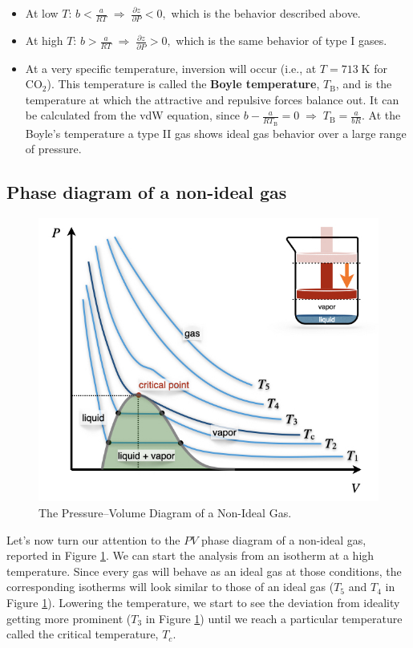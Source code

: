 \documentclass[
  9pt,
]{extbook}
\providecommand{\tightlist}{%
  \setlength{\itemsep}{0pt}\setlength{\parskip}{0pt}}
\theoremstyle{definition}
\theoremstyle{definition}
\theoremstyle{definition}
\theoremstyle{remark}
\begin{document}
\begin{itemize}
\tightlist
\item
  At low \(T\): \(b<\frac{a}{RT} \; \Rightarrow \; \frac{\partial z}{\partial P} < 0,\) which is the behavior described above.
\item
  At high \(T\): \(b>\frac{a}{RT} \; \Rightarrow \; \frac{\partial z}{\partial P} > 0,\) which is the same behavior of type I gases.
\item
  At a very specific temperature, inversion will occur (i.e., at \(T=713 \; \mathrm{K}\) for \(\mathrm{CO}_2\)). This temperature is called the \textbf{Boyle temperature}, \(T_{\mathrm{B}}\), and is the temperature at which the attractive and repulsive forces balance out. It can be calculated from the vdW equation, since \(b-\frac{a}{RT_{\mathrm{B}}}=0 \; \Rightarrow \; T_{\mathrm{B}}=\frac{a}{bR}.\) At the Boyle's temperature a type II gas shows ideal gas behavior over a large range of pressure.
\end{itemize}

\hypertarget{phase-diagram-of-a-non-ideal-gas}{%
\subsection{Phase diagram of a non-ideal gas}\label{phase-diagram-of-a-non-ideal-gas}}

\begin{figure}

{\centering \includegraphics[width=0.6\linewidth]{./img/OEP_Figures.014} 

}

\caption{The Pressure–Volume Diagram of a Non-Ideal Gas.}\label{fig:FigPVni}
\end{figure}

Let's now turn our attention to the \(PV\) phase diagram of a non-ideal gas, reported in Figure \ref{fig:FigPVni}. We can start the analysis from an isotherm at a high temperature. Since every gas will behave as an ideal gas at those conditions, the corresponding isotherms will look similar to those of an ideal gas (\(T_5\) and \(T_4\) in Figure \ref{fig:FigPVni}). Lowering the temperature, we start to see the deviation from ideality getting more prominent (\(T_3\) in Figure \ref{fig:FigPVni}) until we reach a particular temperature called the critical temperature, \(T_c\).
\end{document}
